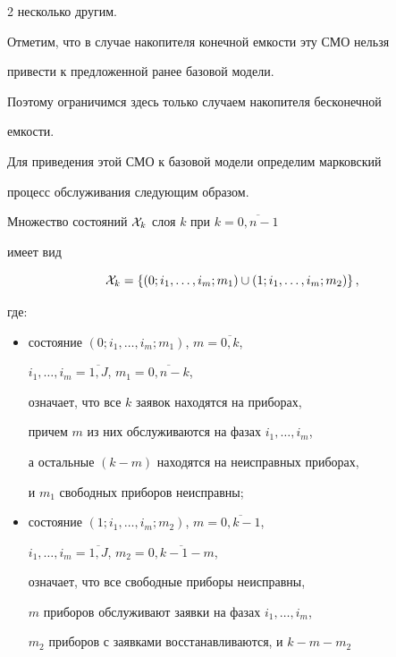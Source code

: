 \begin{multicols}{2}
несколько другим.





Отметим, что в случае накопителя конечной емкости эту СМО нельзя


привести к предложенной ранее базовой модели.


Поэтому ограничимся здесь только случаем накопителя бесконечной


емкости.





Для приведения этой СМО к базовой модели определим марковский


процесс обслуживания следующим образом.





Множество состояний ${\cal X}_k$ слоя $k$ при $k=\overline{0,n-1}$


имеет вид


$$


{\cal X}_k


=


\{(0;i_1,\ldots,i_m;m_1)\cup (1;i_1,\ldots,i_m;m_2)\}\,,


$$


где:


\begin{itemize}


\item состояние $(0;i_1,\ldots,i_m;m_1)$, $m=\overline{0,k}$,


$i_1,\ldots,i_m=\overline{1,J}$, $m_1=\overline{0,n-k}$,


означает, что все $k$ заявок находятся на приборах,


причем $m$ из них обслуживаются на фазах $i_1,\ldots,i_m$,


а остальные $(k-m)$ находятся на неисправных приборах,


и $m_1$ свободных приборов неисправны;


\item


 состояние $(1;i_1,\ldots,i_m;m_2)$, $m=\overline{0,k-1}$,


$i_1,\ldots,i_m=\overline{1,J}$, $m_2=\overline{0,k-1-m}$,


означает, что все свободные приборы неисправны,


$m$ приборов обслуживают заявки на фазах $i_1,\ldots,i_m$,


$m_2$ приборов с заявками вос\-ста\-нав\-ли\-ва\-ют\-ся, и $k-m-m_2$\ \ 



\end{itemize}
\end{multicols}
